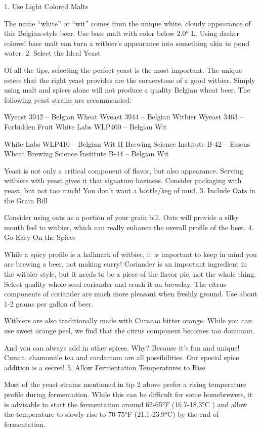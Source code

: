 \documentclass[a4paper,parskip=half]{scrartcl}
\begin{document}
1. Use Light Colored Malts

The name “white” or “wit” comes from the unique white, cloudy appearance of this Belgian-style beer. Use base malt with color below 2.0° L. Using darker colored base malt can turn a witbier’s appearance into something akin to pond water.
2. Select the Ideal Yeast

Of all the tips, selecting the perfect yeast is the most important. The unique esters that the right yeast provides are the cornerstone of a good witbier. Simply using malt and spices alone will not produce a quality Belgian wheat beer. The following yeast strains are recommended:

    Wyeast 3942 – Belgian Wheat
    Wyeast 3944 – Belgian Witbier
    Wyeast 3463 – Forbidden Fruit
    White Labs WLP400 – Belgian Wit

    White Labs WLP410 – Belgian Wit II
    Brewing Science Institute B-42 – Essens Wheat
    Brewing Science Institute B-44 – Belgian Wit

Yeast is not only a critical component of flavor, but also appearance. Serving witbiers with yeast gives it that signature haziness. Consider packaging with yeast, but not too much! You don’t want a bottle/keg of mud.
3. Include Oats in the Grain Bill

Consider using oats as a portion of your grain bill. Oats will provide a silky mouth feel to witbier, which can really enhance the overall profile of the beer.
4. Go Easy On the Spices

While a spicy profile is a hallmark of witbier, it is important to keep in mind you are brewing a beer, not making curry! Coriander is an important ingredient in the witbier style, but it needs to be a piece of the flavor pie, not the whole thing. Select quality whole-seed coriander and crush it on brewday. The citrus components of coriander are much more pleasant when freshly ground. Use about 1-2 grams per gallon of beer.

Witbiers are also traditionally made with Curacao bitter orange. While you can use sweet orange peel, we find that the citrus component becomes too dominant.

And you can always add in other spices. Why? Because it’s fun and unique! Cumin, chamomile tea and cardamom are all possibilities. Our special spice addition is a secret!
5. Allow Fermentation Temperatures to Rise

Most of the yeast strains mentioned in tip 2 above prefer a rising temperature profile during fermentation. While this can be difficult for some homebrewers, it is advisable to start the fermentation around 62-65°F (16.7-18.3°C ) and allow the temperature to slowly rise to 70-75°F (21.1-23.9°C) by the end of fermentation.
\end{document}
